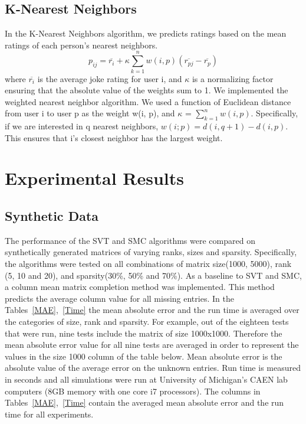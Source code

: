 \documentclass{article} %
\begin{document}
\subsection{K-Nearest Neighbors}
In the K-Nearest Neighbors algorithm, we predicts ratings based on the
mean ratings of each person's nearest neighbors.
\begin{equation*}
  p_{ij}=\overline{r_{i}}+\kappa\sum_{k=1}^n w(i,p)(\overline{r_{pj}}-\overline{r_{p}})
\end{equation*}
where $\overline{r_{i}}$ is the average joke rating for user i, and
$\kappa$ is a normalizing factor ensuring that the absolute value of
the weights sum to 1. We implemented the weighted nearest neighbor
algorithm. We used a function of Euclidean distance from user i to
user p as the weight w(i, p), and $\kappa$ = $\sum_{k=1}^n w(i,p)$.
Specifically, if we are interested in q nearest neighbors, $w(i; p) =
d(i, q +1)- d(i, p)$. This ensures that i’s closest neighbor has the
largest weight.

\section{Experimental Results}

\subsection{Synthetic Data}

The performance of the SVT and SMC algorithms were compared on
synthetically generated matrices of varying ranks, sizes and sparsity.
Specifically, the algorithms were tested on all combinations of matrix
size(1000, 5000), rank (5, 10 and 20), and sparsity(30\%, 50\% and
70\%). As a baseline to SVT and SMC, a column mean matrix completion
method was implemented. This method predicts the average column value
for all missing entries. In the Tables~\ref{MAE},~\ref{Time} the mean
absolute error and the run time is averaged over the categories of
size, rank and sparsity. For example, out of the eighteen tests that
were run, nine tests include the matrix of size 1000x1000. Therefore
the mean absolute error value for all nine tests are averaged in order
to represent the values in the size 1000 column of the table below.
Mean absolute error is the absolute value of the average error on the
unknown entries. Run time is measured in seconds and all simulations
were run at University of Michigan's CAEN lab computers (8GB memory
with one core i7 processors). The columns in
Tables~\ref{MAE},~\ref{Time} contain the averaged mean absolute error
and the run time for all experiments.
\end{document}
